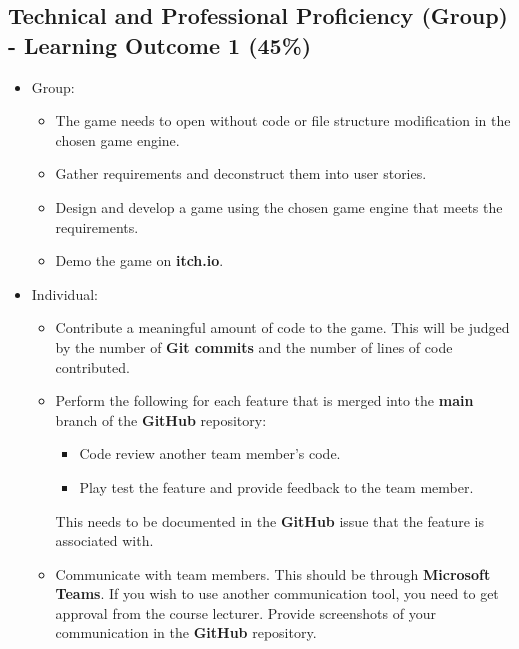 \documentclass{article}
\begin{document}
\subsection*{Technical and Professional Proficiency (Group) - Learning Outcome 1 (45\%)}
\begin{itemize}
	 \item Group:
	\begin{itemize}
		\item The game needs to open without code or file structure modification in the chosen game engine.
		\item Gather requirements and deconstruct them into user stories.
		\item Design and develop a game using the chosen game engine that meets the requirements. 
		\item Demo the game on \textbf{itch.io}.
	\end{itemize}
	\item Individual:
	\begin{itemize}
		\item Contribute a meaningful amount of code to the game. This will be judged by the number of \textbf{Git commits} and the number of lines of code contributed.
		\item Perform the following for each feature that is merged into the \textbf{main} branch of the \textbf{GitHub} repository:
		\begin{itemize}
			\item Code review another team member's code.
			\item Play test the feature and provide feedback to the team member.
		\end{itemize}
		This needs to be documented in the \textbf{GitHub} issue that the feature is associated with.
		\item Communicate with team members. This should be through \textbf{Microsoft Teams}. If you wish to use another communication tool, you need to get approval from the course lecturer. Provide screenshots of your communication in the \textbf{GitHub} repository.
	\end{itemize}
\end{itemize}
\end{document}
